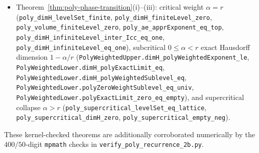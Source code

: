 \begin{itemize}[leftmargin=1.8em]
\texttt{polyExactLevel\_\allowbreak fast\_\allowbreak gauge\_\allowbreak null},
\texttt{polyExactLevel\_\allowbreak slow\_\allowbreak gauge\_\allowbreak non\_\allowbreak sigma\_\allowbreak finite},
\texttt{polyExactLevel\_\allowbreak liminf\_\allowbreak four\_\allowbreak way},
\texttt{polyUnsignedExactLimit\_\allowbreak liminf\_\allowbreak four\_\allowbreak way}),
and signed exact-limit coset collapse
$E_{\mathrm{lim}}^{(r,c,d),\pm}(k/c)=x_k^\pm+L^{(r,c,d)}$
(\texttt{poly\_\allowbreak trichotomy\_\allowbreak part\_\allowbreak iii\_\allowbreak complete});
\item Theorem~\ref{thm:poly-phase-transition}(i)--(iii): critical weight
$\alpha=r$ (\texttt{poly\_\allowbreak dimH\_\allowbreak levelSet\_\allowbreak finite},
\texttt{poly\_\allowbreak dimH\_\allowbreak finiteLevel\_\allowbreak zero},
\texttt{poly\_\allowbreak volume\_\allowbreak finiteLevel\_\allowbreak zero},
\texttt{poly\_\allowbreak ae\_\allowbreak apprExponent\_\allowbreak eq\_\allowbreak top},
\texttt{poly\_\allowbreak dimH\_\allowbreak infiniteLevel\_\allowbreak inter\_\allowbreak Icc\_\allowbreak eq\_\allowbreak one},
\texttt{poly\_\allowbreak dimH\_\allowbreak infiniteLevel\_\allowbreak eq\_\allowbreak one}),
subcritical $0\le\alpha<r$ exact Hausdorff dimension $1-\alpha/r$
(\texttt{Poly\allowbreak Weighted\allowbreak Upper.\allowbreak dimH\_\allowbreak poly\allowbreak Weighted\allowbreak Exponent\_\allowbreak le},
\texttt{Poly\allowbreak Weighted\allowbreak Lower.\allowbreak dimH\_\allowbreak poly\allowbreak Exact\allowbreak Limit\_\allowbreak eq},
\texttt{Poly\allowbreak Weighted\allowbreak Lower.\allowbreak dimH\_\allowbreak poly\allowbreak Weighted\allowbreak Sublevel\_\allowbreak eq},
\texttt{Poly\allowbreak Weighted\allowbreak Lower.\allowbreak poly\allowbreak Zero\allowbreak Weight\allowbreak Sublevel\_\allowbreak eq\_\allowbreak univ},
\texttt{Poly\allowbreak Weighted\allowbreak Lower.\allowbreak poly\allowbreak Exact\allowbreak Limit\_\allowbreak zero\_\allowbreak eq\_\allowbreak empty}),
and supercritical collapse $\alpha>r$
(\texttt{poly\_\allowbreak supercritical\_\allowbreak levelSet\_\allowbreak eq\_\allowbreak lattice},
\texttt{poly\_\allowbreak supercritical\_\allowbreak dimH\_\allowbreak zero},
\texttt{poly\_\allowbreak supercritical\_\allowbreak empty\_\allowbreak neg}).
\end{itemize}
These kernel-checked theorems are additionally corroborated numerically by the
$400/50$-digit \texttt{mpmath} checks in
\texttt{verify\_\allowbreak poly\_\allowbreak recurrence\_\allowbreak 2b.py}.

